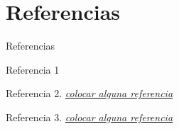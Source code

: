 \section{Referencias}
\begin{frame}{Referencias}
	\begin{thebibliography}{00}
		\beamertemplatebookbibitems
		Referencia 1
		
		\beamertemplateonlinebibitems
		Referencia 2. \href{}{\em colocar alguna referencia}
		
		\beamertemplatearticlebibitems
		Referencia 3. \href{}{\em colocar alguna referencia}
	\end{thebibliography}
\end{frame}